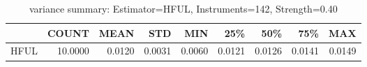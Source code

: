 \begin{table}[ht]
\centering
\caption{variance summary: Estimator=HFUL, Instruments=142, Strength=0.40}
\begin{tabular}{lrrrrrrrr}
\toprule
 & COUNT & MEAN & STD & MIN & 25\% & 50\% & 75\% & MAX \\
\midrule
HFUL & 10.0000 & 0.0120 & 0.0031 & 0.0060 & 0.0121 & 0.0126 & 0.0141 & 0.0149 \\
\bottomrule
\end{tabular}
\end{table}
